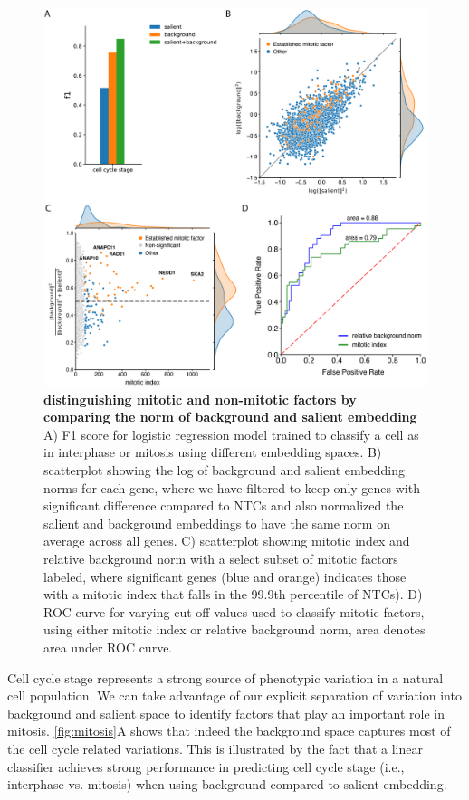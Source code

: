 \documentclass{article}
\begin{document}
\begin{figure}[h!]
    \centering
    \includegraphics[width=\textwidth]{figure/figure_4.png}
    \caption{\textbf{distinguishing mitotic and non-mitotic factors by comparing the norm of background and salient embedding}
    A) F1 score for logistic regression model trained to classify a cell as in interphase or mitosis using different embedding spaces.
    B) scatterplot showing the log of background and salient embedding norms for each gene, where we have filtered to keep only genes with significant difference compared to NTCs and also normalized the salient and background embeddings to have the same norm on average across all genes.
    C) scatterplot showing mitotic index and relative background norm with a select subset of mitotic factors labeled, where significant genes (blue and orange) indicates those with a mitotic index that falls in the 99.9th percentile of NTCs).
    D) ROC curve for varying cut-off values used to classify mitotic factors, using either mitotic index or relative background norm, area denotes area under ROC curve.}
    \label{fig:mitosis}
\end{figure}

Cell cycle stage represents a strong source of phenotypic variation in a natural cell population. We can take advantage of our explicit separation of variation into background and salient space to identify factors that play an important role in mitosis. \autoref{fig:mitosis}A shows that indeed the background space captures most of the cell cycle related variations. This is illustrated by the fact that a linear classifier achieves strong performance in predicting cell cycle stage (i.e., interphase vs. mitosis) when using background compared to salient embedding.
\end{document}
